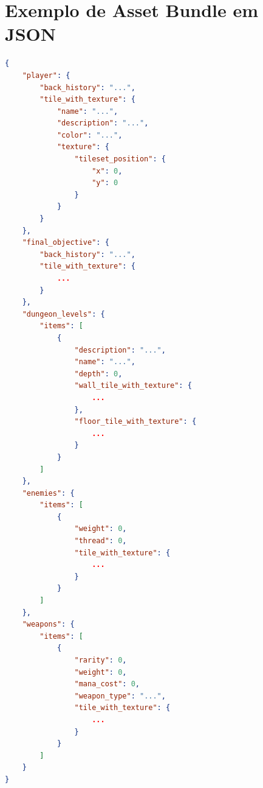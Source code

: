 \chapter{Exemplo de Asset Bundle em JSON}
\label{ap:exemplo_json}



\begin{lstlisting}[language=json, caption={Exemplo de saída \gls{JSON}}, label={lst:json_code}]
{
    "player": {
        "back_history": "...",
        "tile_with_texture": {
            "name": "...",
            "description": "...",
            "color": "...",
            "texture": {
                "tileset_position": {
                    "x": 0,
                    "y": 0
                }
            }
        }
    },
    "final_objective": {
        "back_history": "...",
        "tile_with_texture": { 
            ...
        }
    },
    "dungeon_levels": {
        "items": [
            {
                "description": "...",
                "name": "...",
                "depth": 0,
                "wall_tile_with_texture": {
                    ...
                },
                "floor_tile_with_texture": {
                    ...
                }
            }
        ]
    },
    "enemies": {
        "items": [
            {
                "weight": 0,
                "thread": 0,
                "tile_with_texture": { 
                    ...
                }
            }
        ]
    },
    "weapons": {
        "items": [
            {
                "rarity": 0,
                "weight": 0,
                "mana_cost": 0,
                "weapon_type": "...",
                "tile_with_texture": {
                    ...
                }
            }
        ]
    }
}
\end{lstlisting}